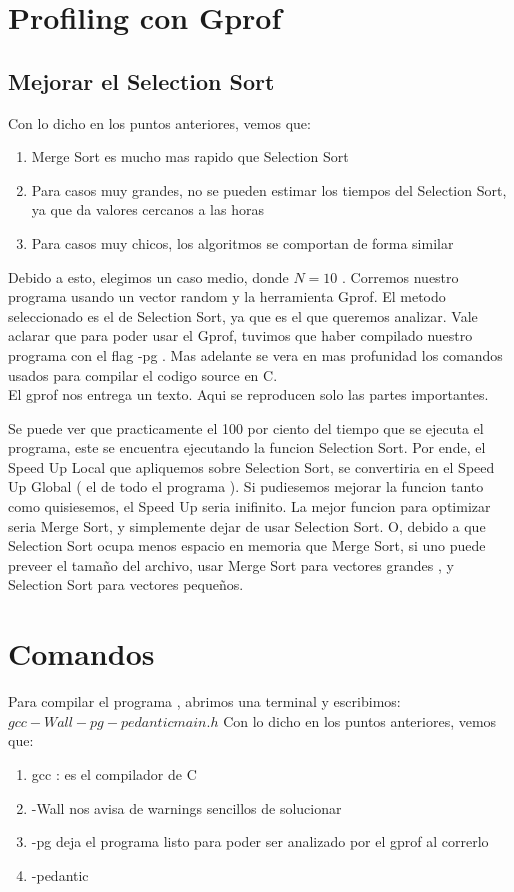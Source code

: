 \newpage

\section{Profiling con Gprof}
\subsection{Mejorar el Selection Sort}
Con lo dicho en los puntos anteriores, vemos que:
\begin{enumerate} 
 \item {Merge Sort es mucho mas rapido que Selection Sort}
 \item {Para casos muy grandes, no se pueden estimar los tiempos del Selection Sort, ya que da valores cercanos a las horas}
 \item {Para casos muy chicos, los algoritmos se comportan de forma similar}
\end{enumerate}
Debido a esto, elegimos un caso medio, donde $N = 10$ . Corremos nuestro programa usando un vector random y la herramienta Gprof.
El metodo seleccionado es el de Selection Sort, ya que es el que queremos analizar.
Vale aclarar que para poder usar el Gprof, tuvimos que haber compilado nuestro programa con el flag -pg .
Mas adelante se vera en mas profunidad los comandos usados para compilar el codigo source en C.\\ 
El gprof nos entrega un texto. Aqui se reproducen solo las partes importantes.



Se puede ver que practicamente el 100 por ciento del tiempo que se ejecuta el programa, este se encuentra ejecutando la funcion Selection Sort.
Por ende, el Speed Up Local que apliquemos sobre Selection Sort, se convertiria en el Speed Up Global ( el de todo el programa ).
Si pudiesemos mejorar la funcion tanto como quisiesemos, el Speed Up seria inifinito.
La mejor funcion para optimizar seria Merge Sort, y simplemente dejar de usar Selection Sort.
O, debido a que Selection Sort ocupa menos espacio en memoria que Merge Sort, si uno puede preveer el tamaño del archivo, usar
Merge Sort para vectores grandes , y Selection Sort para vectores pequeños.

\section{Comandos}
Para compilar el programa , abrimos una terminal y escribimos:\\
$gcc -Wall -pg -pedantic main.h$
Con lo dicho en los puntos anteriores, vemos que:
\begin{enumerate} 
 \item gcc : es el compilador de C
 \item -Wall nos avisa de warnings sencillos de solucionar	
 \item -pg deja el programa listo para poder ser analizado por el gprof al correrlo
 \item -pedantic

\end{enumerate}

